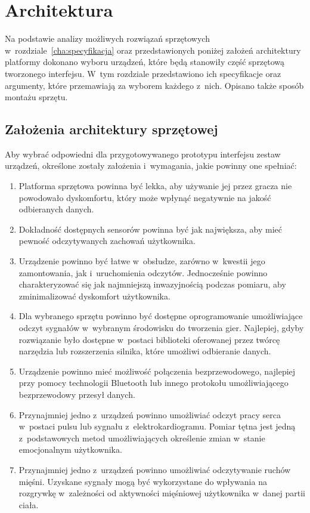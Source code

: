 \chapter{Architektura}
\label{cha:architektura}
Na podstawie analizy możliwych rozwiązań sprzętowych w~rozdziale~\ref{cha:specyfikacja} oraz przedstawionych poniżej założeń architektury platformy dokonano wyboru urządzeń, które będą stanowiły część sprzętową tworzonego interfejsu. W~tym rozdziale przedstawiono ich specyfikacje oraz argumenty, które przemawiają za wyborem każdego z~nich. Opisano także sposób montażu sprzętu.

\section{Założenia architektury sprzętowej}
Aby wybrać odpowiedni dla przygotowywanego prototypu interfejsu zestaw urządzeń, określone zostały założenia i~wymagania, jakie powinny one spełniać:
\begin{enumerate}
	\item Platforma sprzętowa powinna być lekka, aby używanie jej przez gracza nie powodowało dyskomfortu, który może wpłynąć negatywnie na jakość odbieranych danych.
	\item Dokładność dostępnych sensorów powinna być jak największa, aby mieć pewność odczytywanych zachowań użytkownika.
	\item Urządzenie powinno być łatwe w~obsłudze, zarówno w~kwestii jego zamontowania, jak i~uruchomienia odczytów. Jednocześnie powinno charakteryzować się jak najmniejszą inwazyjnością podczas pomiaru, aby zminimalizować dyskomfort użytkownika.
	\item Dla wybranego sprzętu powinno być dostępne oprogramowanie umożliwiające odczyt sygnałów w~wybranym środowisku do tworzenia gier. Najlepiej, gdyby rozwiązanie było dostępne w~postaci biblioteki oferowanej przez twórcę narzędzia lub rozszerzenia silnika, które umożliwi odbieranie danych.
	\item Urządzenie powinno mieć możliwość połączenia bezprzewodowego, najlepiej przy pomocy technologii Bluetooth lub innego protokołu umożliwiającego bezprzewodowy przesył danych.
	\item Przynajmniej jedno z~urządzeń powinno umożliwiać odczyt pracy serca w~postaci pulsu lub sygnału z~elektrokardiogramu. Pomiar tętna jest jedną z~podstawowych metod umożliwiających określenie zmian w~stanie emocjonalnym użytkownika.
	\item Przynajmniej jedno z~urządzeń powinno umożliwiać odczytywanie ruchów mięśni. Uzyskane sygnały mogą być wykorzystane do wpływania na rozgrywkę w~zależności od aktywności mięśniowej użytkownika w~danej partii ciała.
\end{enumerate}


